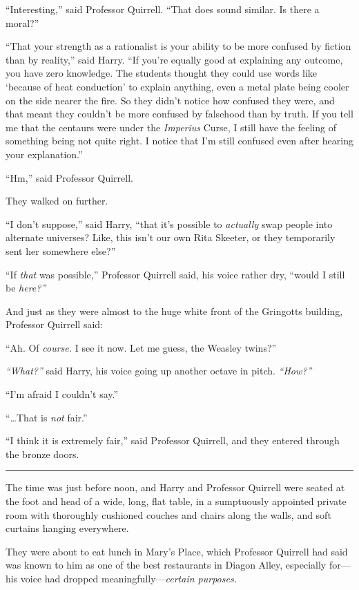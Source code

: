 ``Interesting,'' said Professor Quirrell. ``That does sound similar. Is
there a moral?''

``That your strength as a rationalist is your ability to be more
confused by fiction than by reality,'' said Harry. ``If you're equally
good at explaining any outcome, you have zero knowledge. The students
thought they could use words like `because of heat conduction' to
explain anything, even a metal plate being cooler on the side nearer the
fire. So they didn't notice how confused they were, and that meant they
couldn't be more confused by falsehood than by truth. If you tell me
that the centaurs were under the \emph{Imperius} Curse, I still have the
feeling of something being not quite right. I notice that I'm still
confused even after hearing your explanation.''

``Hm,'' said Professor Quirrell.

They walked on further.

``I don't suppose,'' said Harry, ``that it's possible to \emph{actually}
swap people into alternate universes? Like, this isn't our own Rita
Skeeter, or they temporarily sent her somewhere else?''

``If \emph{that} was possible,'' Professor Quirrell said, his voice
rather dry, ``would I still be \emph{here?''}

And just as they were almost to the huge white front of the Gringotts
building, Professor Quirrell said:

``Ah. Of \emph{course.} I see it now. Let me guess, the Weasley twins?''

\emph{``What?''} said Harry, his voice going up another octave in pitch.
\emph{``How?''}

``I'm afraid I couldn't say.''

``\ldots{}That is \emph{not} fair.''

``I think it is extremely fair,'' said Professor Quirrell, and they
entered through the bronze doors.

\begin{center}\rule{3in}{0.4pt}\end{center}

The time was just before noon, and Harry and Professor Quirrell were
seated at the foot and head of a wide, long, flat table, in a
sumptuously appointed private room with thoroughly cushioned couches and
chairs along the walls, and soft curtains hanging everywhere.

They were about to eat lunch in Mary's Place, which Professor Quirrell
had said was known to him as one of the best restaurants in Diagon
Alley, especially for---his voice had dropped
meaningfully---\emph{certain purposes.}

